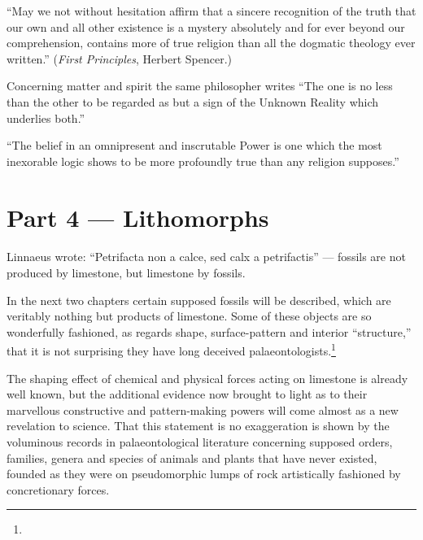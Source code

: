 \documentclass[a4paper, 12pt, oneside]{article}
\begin{document}
``May we not without hesitation affirm that a sincere recognition of the truth that our own and all other existence is a mystery absolutely and for ever beyond our comprehension, contains more of true religion than all the dogmatic theology ever written.'' (\emph{First Principles}, Herbert Spencer.)

Concerning matter and spirit the same philosopher writes ``The one is no less than the other to be regarded as but a sign of the Unknown Reality which underlies both.''

``The belief in an omnipresent and inscrutable Power is one which the most inexorable logic shows to be more profoundly true than any religion supposes.''
\clearpage
\section{Part 4 --- Lithomorphs}
\paragraph{}
Linnaeus wrote: ``Petrifacta non a calce, sed calx a petrifactis'' --- fossils are not produced by limestone, but limestone by fossils.

In the next two chapters certain supposed fossils will be described, which are veritably nothing but products of limestone. Some of these objects are so wonderfully fashioned, as regards shape, surface-pattern and interior ``structure,'' that it is not surprising they have long deceived palaeontologists.\footnote{}

The shaping effect of chemical and physical forces acting on limestone is already well known, but the additional evidence now brought to light as to their marvellous constructive and pattern-making powers will come almost as a new revelation to science. That this statement is no exaggeration is shown by the voluminous records in palaeontological literature concerning supposed orders, families, genera and species of animals and plants that have never existed, founded as they were on pseudomorphic lumps of rock artistically fashioned by concretionary forces.
\end{document}
